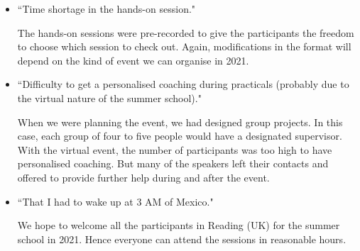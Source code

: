\begin{itemize}
\begin{itemize}
\item ``Time shortage in the hands-on session."

The hands-on sessions were pre-recorded to give the participants the freedom to choose which session to check out. Again, modifications in the format will depend on the kind of event we can organise in 2021.

\item ``Difficulty to get a personalised coaching during practicals (probably due to the virtual
nature of the summer school)."

When we were planning the event, we had designed group projects. In this case, each group of four to five people would have a designated supervisor. With the virtual event, the number of participants was too high to have personalised coaching. But many of the speakers left their contacts and offered to provide further help during and after the event.

\item ``That I had to wake up at 3 AM of Mexico."

We hope to welcome all the participants in Reading (UK) for the summer school in 2021. Hence everyone can attend the sessions in reasonable hours.

\end{itemize}

\end{itemize}
